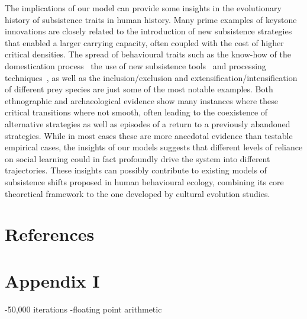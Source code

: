 \documentclass[review,authoryear]{elsarticle}
\begin{document}
The implications of our model can provide some insights in the evolutionary history of subsistence traits in human history. Many prime examples of keystone innovations are closely related to the introduction of new subsistence strategies that enabled a larger carrying capacity, often coupled with the cost of higher critical densities. The spread of behavioural traits such as the know-how of the domestication process~\citep{barker2006} the use of new subsistence tools~\citep{petraglia_population_2009} and processing techniques~\citep{molleson1993}, as well as the inclusion/exclusion and extensification/intensification of different prey species are just some of the most notable examples. Both ethnographic and archaeological evidence show many instances where these critical transitions where not smooth, often leading to the coexistence of alternative strategies as well as episodes of a return to a previously abandoned strategies. %
While in most cases these are more anecdotal evidence than testable empirical cases, the insights of our models suggests that different levels of reliance on social learning could in fact profoundly drive the system into different trajectories.  These insights can possibly contribute to existing models of subsistence shifts proposed in human behavioural ecology\citep{smith1992,bird2006,kennett2006}, combining its core theoretical framework to the one developed by cultural evolution studies. 






\section{References}




\section{Appendix I}

-50,000 iterations
-floating point arithmetic
\end{document}
